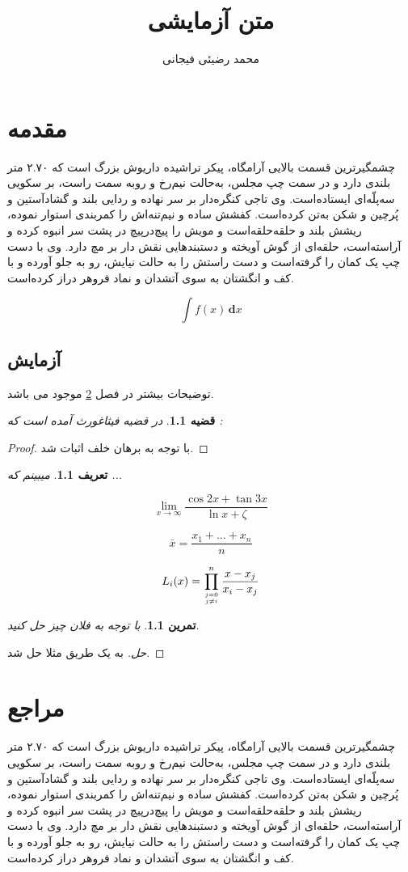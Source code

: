 \documentclass[12pt]{book}
\title{متن آزمایشی}
\author{محمد رضیئی فیجانی}
\newtheorem{thm}{قضیه}[section]
\newtheorem{Def}{تعریف}[section]
\newtheorem{test}{تمرین}[chapter]
\newcommand{\dd}{\, \mathbf{d} }
\begin{document}
\maketitle
\tableofcontents
\chapter{مقدمه}\label{chpt1}

چشمگیرترین قسمت بالایی آرامگاه، پیکر تراشیده داریوش بزرگ است که ۲.۷۰ متر بلندی دارد و در سمت چپ مجلس، به‌حالت نیم‌رخ و روبه سمت راست، بر سکویی سه‌پلّه‌ای ایستاده‌است. وی تاجی کنگره‌دار بر سر نهاده و ردایی بلند و گشادآستین و پُرچین و شکن به‌تن کرده‌است. کفشش ساده و نیم‌تنه‌اش را کمربندی استوار نموده، ریشش بلند و حلقه‌حلقه‌است و مویش را پیچ‌درپیچ در پشت سر انبوه کرده و آراسته‌است، حلقه‌ای از گوش آویخته و دستبندهایی نقش دار بر مچ دارد. وی با دست چپ یک کمان را گرفته‌است و دست راستش را به حالت نیایش، رو به جلو آورده و با کف و انگشتان به‌ سوی آتشدان و نماد فروهر دراز کرده‌است.

\[
\int f(x) \dd{x}
\]
\section{آزمایش}

توضیحات بیشتر در فصل 
\ref{chpt2}
موجود می باشد.
\begin{thm}
در قضیه فیثاغورث آمده است که :
\end{thm}
\begin{proof}
	با توجه به برهان خلف اثبات شد.
\end{proof}
\begin{Def}
	میبینم که ... 
\end{Def}

\[
	\lim_{x \to \infty} \frac{\cos 2x + \tan 3x}{\ln x + \zeta}
\]

\[
\bar{x} = \frac{x_1 + \dots+x_n}{n}	
\]

\[
L_{i}(x)=\prod_{j=0 \atop j \neq i}^{n} \frac{x-x_{j}}{x_{i}-x_{j}}
\]

\begin{test}
	با توجه به فلان چیز حل کنید.
\end{test}
\begin{proof}[حل]
	به یک طریق مثلا حل شد.
\end{proof}
\chapter{مراجع}\label{chpt2}

چشمگیرترین قسمت بالایی آرامگاه، پیکر تراشیده داریوش بزرگ است که ۲.۷۰ متر بلندی دارد و در سمت چپ مجلس، به‌حالت نیم‌رخ و روبه سمت راست، بر سکویی سه‌پلّه‌ای ایستاده‌است. وی تاجی کنگره‌دار بر سر نهاده و ردایی بلند و گشادآستین و پُرچین و شکن به‌تن کرده‌است. کفشش ساده و نیم‌تنه‌اش را کمربندی استوار نموده، ریشش بلند و حلقه‌حلقه‌است و مویش را پیچ‌درپیچ در پشت سر انبوه کرده و آراسته‌است، حلقه‌ای از گوش آویخته و دستبندهایی نقش دار بر مچ دارد. وی با دست چپ یک کمان را گرفته‌است و دست راستش را به حالت نیایش، رو به جلو آورده و با کف و انگشتان به‌ سوی آتشدان و نماد فروهر دراز کرده‌است.
\end{document}
